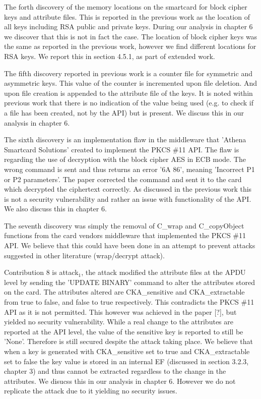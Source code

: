 \documentclass[bsc,frontabs,twoside,singlespacing,parskip,deptreport]{infthesis}     %
\begin{document}
The forth discovery of the memory locations on the smartcard for block cipher keys and attribute files. This is reported in the previous work as the location of all keys including RSA public and private keys. During our analysis in chapter 6 we discover that this is not in fact the case. The location of block cipher keys was the same as reported in the previous work, however we find different locations for RSA keys. We report this in section 4.5.1, as part of extended work.

The fifth discovery reported in previous work is a counter file for symmetric and asymmetric keys. This value of the counter is incremented upon file deletion. And upon file creation is appended to the attribute file of the keys. It is noted within previous work that there is no indication of the value being used (e.g. to check if a file has been created, not by the API) but is present. We discuss this in our analysis in chapter 6.

The sixth discovery is an implementation flaw in the middleware that 'Athena Smartcard Solutions' created to implement the PKCS \#11 API. The flaw is regarding the use of decryption with the block cipher AES in ECB mode. The wrong command is sent and thus returns an error '6A 86', meaning 'Incorrect P1 or P2 parameters'. The paper corrected the command and sent it to the card which decrypted the ciphertext correctly. As discussed in the previous work this is not a security vulnerability and rather an issue with functionality of the API. We also discuss this in chapter 6. 

The seventh discovery was simply the removal of C\_wrap and C\_copyObject functions from the card vendors middleware that implemented the PKCS \#11 API. We believe that this could have been done in an attempt to prevent attacks suggested in other literature (wrap/decrypt attack).

Contribution 8 is attack$_1$, the attack modified the attribute files at the APDU level by sending the 'UPDATE BINARY' command to alter the attributes stored on the card. The attributes altered are CKA\_sensitive and CKA\_extractable from true to false, and false to true respectively. This contradicts the PKCS \#11 API as it is not permitted. This however was achieved in the paper [?], but yielded no security vulnerability. While a real change to the attributes are reported at the API level, the value of the sensitive key is reported to still be 'None'. Therefore is still secured despite the attack taking place. We believe that when a key is generated with CKA\_sensitive set to true and CKA\_extractable set to false the key value is stored in an internal EF (discussed in section 3.2.3, chapter 3) and thus cannot be extracted regardless to the change in the attributes. We disucss this in our analysis in chapter 6. However we do not replicate the attack due to it yielding no security issues.
\end{document}
